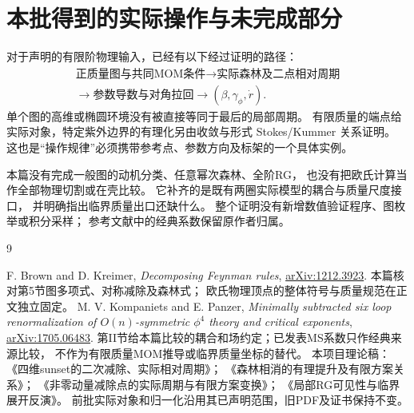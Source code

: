 \documentclass[11pt,a4paper]{ctexart}
\theoremstyle{cnplain}
\theoremstyle{remark}\newtheorem{remark}[theorem]{注}
\begin{document}
\section{本批得到的实际操作与未完成部分}
对于声明的有限阶物理输入，已经有以下经过证明的路径：
\[
 \begin{gathered}
 \text{正质量图与共同MOM条件}
 \longrightarrow \text{实际森林及二点相对周期}\\
 \longrightarrow \text{参数导数与对角拉回}
 \longrightarrow (\beta,\gamma_\phi,\dot r).
 \end{gathered}
\]
单个图的高维或椭圆环境没有被直接等同于最后的局部周期。
有限质量的端点给实际对象，特定紫外边界的有理化另由收敛与形式
Stokes/Kummer 关系证明。
这也是“操作规律”必须携带参考点、参数方向及标架的一个具体实例。

本篇没有完成一般图的动机分类、任意幂次森林、全阶RG，
也没有把欧氏计算当作全部物理切割或在壳比较。
它补齐的是既有两圈实际模型的耦合与质量尺度接口，
并明确指出临界质量出口还缺什么。
整个证明没有新增数值验证程序、图枚举或积分采样；
参考文献中的经典系数保留原作者归属。

\begin{thebibliography}{9}\raggedright
{} F. Brown and D. Kreimer,
\emph{Decomposing Feynman rules},
\href{https://arxiv.org/abs/1212.3923}{arXiv:1212.3923}.
本篇核对第5节图多项式、对称减除及森林式；
欧氏物理顶点的整体符号与质量规范在正文独立固定。
 M. V. Kompaniets and E. Panzer,
\emph{Minimally subtracted six loop renormalization of
$O(n)$-symmetric $\phi^4$ theory and critical exponents},
\href{https://arxiv.org/abs/1705.06483}{arXiv:1705.06483}.
第II节给本篇比较的耦合和场约定；已发表MS系数只作经典来源比较，
不作为有限质量MOM推导或临界质量坐标的替代。
 本项目理论稿：
《四维sunset的二次减除、实际相对周期》；
《森林相消的有理提升及有限方案关系》；
《非零动量减除点的实际周期与有限方案变换》；
《局部RG可见性与临界展开反演》。
前批实际对象和归一化沿用其已声明范围，旧PDF及证书保持不变。
\end{thebibliography}
\end{document}
